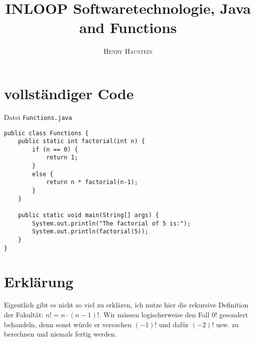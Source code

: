 \documentclass{article}
\title{\textbf{INLOOP Softwaretechnologie, Java and Functions}}
\author{\textsc{Henry Haustein}}
\date{}
\begin{document}
	\maketitle
	
	\section*{vollständiger Code}
	Datei \texttt{Functions.java}
	\begin{lstlisting}[style=java,tabsize=2]
public class Functions {
	public static int factorial(int n) {
		if (n == 0) {
			return 1;
		}
		else {
			return n * factorial(n-1);
		}
	}
	
	public static void main(String[] args) {
		System.out.println("The factorial of 5 is:");
		System.out.println(factorial(5));
	}
}
	\end{lstlisting}

	\section*{Erklärung}
	Eigentlich gibt es nicht so viel zu erklären, ich nutze hier die rekursive Definition der Fakultät: $n! = n\cdot (n-1)!$. Wir müssen logischerweise den Fall $0!$ gesondert behandeln, denn sonst würde er versuchen $(-1)!$ und dafür $(-2)!$ usw. zu berechnen und niemals fertig werden.
	
	
\end{document}
